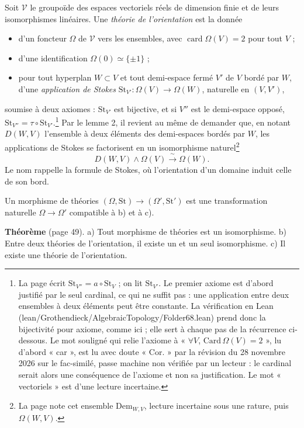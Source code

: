 \documentclass[11pt,a4paper]{article}
\begin{document}
Soit $\mathcal{V}$ le groupoïde des espaces vectoriels réels de dimension
finie et de leurs isomorphismes linéaires. Une \emph{théorie de
l'orientation} est la donnée
\begin{itemize}
  \item[a)] d'un foncteur $\Omega$ de $\mathcal{V}$ vers les ensembles, avec
  $\operatorname{card} \Omega(V) = 2$ pour tout $V$ ;
  \item[b)] d'une identification $\Omega(0) \simeq \{\pm 1\}$ ;
  \item[c)] pour tout hyperplan $W \subset V$ et tout demi-espace fermé $V'$
  de $V$ bordé par $W$, d'une \emph{application de Stokes}
  $\mathrm{St}_{V'} : \Omega(V) \to \Omega(W)$, naturelle en $(V, V')$,
\end{itemize}
soumise à deux axiomes : $\mathrm{St}_{V'}$ est bijective, et si $V''$ est le
demi-espace opposé, $\mathrm{St}_{V''} = \tau \circ \mathrm{St}_{V'}$.\footnote{La page écrit $\mathrm{St}_{V''} = a \circ \mathrm{St}_V$ ; on lit
$\mathrm{St}_{V'}$. Le premier axiome est d'abord justifié par le seul
cardinal, ce qui ne suffit pas : une application entre deux ensembles à deux
éléments peut être constante. La vérification en Lean
(lean/Grothendieck/AlgebraicTopology/Folder68.lean) prend donc la bijectivité pour axiome,
comme ici ; elle sert à chaque pas de la récurrence ci-dessous. Le mot
souligné qui relie l'axiome à « $\forall V$, $\mathrm{Card}\,\Omega(V) = 2$ »,
lu d'abord « car », est lu avec doute « Cor. » par la révision du 28 novembre
2026 sur le fac-similé, passe machine non vérifiée par un lecteur : le cardinal
serait alors une conséquence de l'axiome et non sa justification. Le mot
« vectoriels » est d'une lecture incertaine.} Par le lemme 2, il revient au même de demander que, en notant
$D(W, V)$ l'ensemble à deux éléments des demi-espaces bordés par $W$, les
applications de Stokes se factorisent en un isomorphisme
naturel\footnote{La page note cet ensemble $\mathrm{Dem}_{W,V}$, lecture
incertaine sous une rature, puis $\Omega(W, V)$.}
\[
D(W, V) \wedge \Omega(V) \xrightarrow{\ \sim\ } \Omega(W).
\]
Le nom rappelle la formule de Stokes,
où l'orientation d'un domaine induit celle de son bord.

Un morphisme de théories $(\Omega, \mathrm{St}) \to (\Omega', \mathrm{St}')$
est une transformation naturelle $\Omega \to \Omega'$ compatible à b) et à c).

\textbf{Théorème} (page 49). a) Tout morphisme de théories est un
isomorphisme. b) Entre deux théories de l'orientation, il existe un et un
seul isomorphisme. c) Il existe une théorie de l'orientation.
\end{document}
